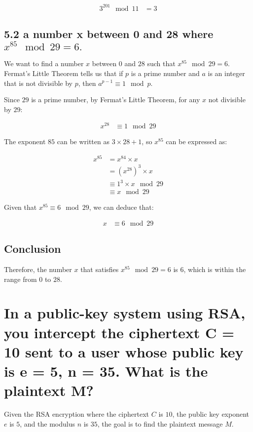 \documentclass[9pt]{article}
\begin{document}
\begin{CJK*}{UTF8}{gbsn}
\begin{align*}
3^{201} \mod 11 &= 3
\end{align*}

\subsection*{5.2 a number x between 0 and 28 where $x^{85} \mod 29=6.$}
We want to find a number \( x \) between \( 0 \) and \( 28 \) such that \( x^{85} \mod 29 = 6 \). Fermat's Little Theorem tells us that if \( p \) is a prime number and \( a \) is an integer that is not divisible by \( p \), then \( a^{p-1} \equiv 1 \mod p \).

Since \( 29 \) is a prime number, by Fermat's Little Theorem, for any \( x \) not divisible by \( 29 \):

\begin{align*}
x^{28} &\equiv 1 \mod 29
\end{align*}

The exponent \( 85 \) can be written as \( 3 \times 28 + 1 \), so \( x^{85} \) can be expressed as:

\begin{align*}
x^{85} &= x^{84} \times x \\
&= (x^{28})^3 \times x \\
&\equiv 1^3 \times x \mod 29 \\
&\equiv x \mod 29
\end{align*}

Given that \( x^{85} \equiv 6 \mod 29 \), we can deduce that:

\begin{align*}
x &\equiv 6 \mod 29
\end{align*}

\subsection*{Conclusion}

Therefore, the number \( x \) that satisfies \( x^{85} \mod 29 = 6 \) is \( 6 \), which is within the range from \( 0 \) to \( 28 \).

\newpage

\section*{In a public-key system using RSA, you intercept the ciphertext C = 10 sent to a user whose public key is e = 5, n = 35. What is the plaintext M?}
Given the RSA encryption where the ciphertext \( C \) is \( 10 \), the public key exponent \( e \) is \( 5 \), and the modulus \( n \) is \( 35 \), the goal is to find the plaintext message \( M \).


\end{CJK*}
\end{document}
